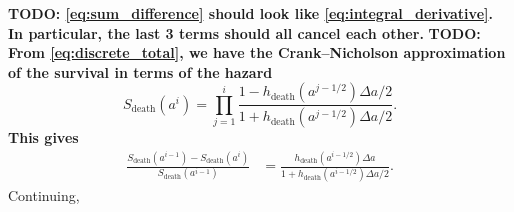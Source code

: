 \documentclass[12pt]{article}
\begin{document}
%
\textbf{TODO: \eqref{eq:sum_difference} should look like
  \eqref{eq:integral_derivative}. In particular, the last 3 terms should
  all cancel each other.}
%
\textbf{TODO: From \eqref{eq:discrete_total}, we have the
  Crank--Nicholson approximation of the survival in terms of the
  hazard}
\begin{displaymath}
  S_{\text{death}}(a^i)
  = \prod_{j = 1}^i \frac{
    1 - h_{\text{death}}(a^{j - 1 / 2}) \Delta a / 2
  }{
    1 + h_{\text{death}}(a^{j - 1 / 2}) \Delta a / 2
  }.
\end{displaymath}
\textbf{This gives}
\begin{displaymath}
  \begin{split}
    \frac{
      S_{\text{death}}(a^{i - 1}) - S_{\text{death}}(a^i)
    }{
      S_{\text{death}}(a^{i - 1})
    }
    &= \frac{
      h_{\text{death}}(a^{i - 1 / 2}) \Delta a
    }{
      1 + h_{\text{death}}(a^{i - 1 / 2}) \Delta a / 2
    }.
  \end{split}
\end{displaymath}
%
Continuing,
\end{document}

